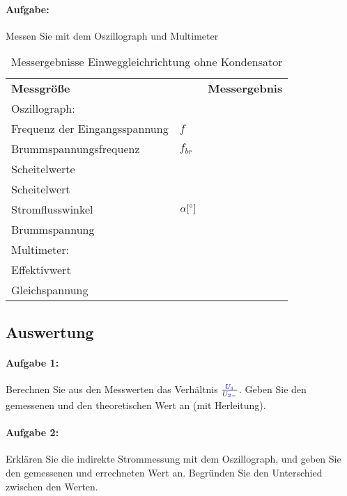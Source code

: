 \documentclass[11pt,a4paper,titlepage]{scrreprt}
\begin{document}
				\paragraph{Aufgabe:} Messen Sie mit dem Oszillograph und Multimeter
					\begin{table}[!hbtp]
						\caption{Messergebnisse Einweggleichrichtung ohne Kondensator}
						\label{tbl:messergebnisse1.1}
						\renewcommand{\arraystretch}{1.3}
						\begin{tabular}{ll|l}
							\multicolumn{2}{l}{\textbf{Messgröße}} & \textbf{Messergebnis}\\ 
                            \multicolumn{3}{l}{Oszillograph:}\\\hline
							Frequenz der Eingangsspannung & $f$ & \\
							Brummspannungsfrequenz & $f_{br}$ &\\
							Scheitelwerte & \spannung{$U_{1_{max}}$} &\\
							Scheitelwert & \spannung{$U_{2_{max}}$} &\\
							Stromflusswinkel &  $\alpha [ \degree]$& \\
							Brummspannung &  \spannung{$U_{brmax}$} &\\
                                                        \multicolumn{3}{l}{Multimeter:}\\\hline
							Effektivwert & \spannung{$U_{1}$} &\\%
							Gleichspannung & \spannung{$U_{2-}$} & \\
						\end{tabular}
					\end{table}
		\subsection{Auswertung}
			\paragraph{Aufgabe 1:} Berechnen Sie aus den Messwerten das Verhältnis $\frac{\textcolor{blue}{U_1}}{\textcolor{blue}{U_{2-}}}$. Geben Sie den gemessenen und den theoretischen Wert an (mit Herleitung).
            
            \paragraph{Aufgabe 2:} Erklären Sie die indirekte Strommessung mit dem Oszillograph, und geben Sie den gemessenen und errechneten Wert an. Begründen Sie den Unterschied zwischen den Werten.
	
\end{document}
